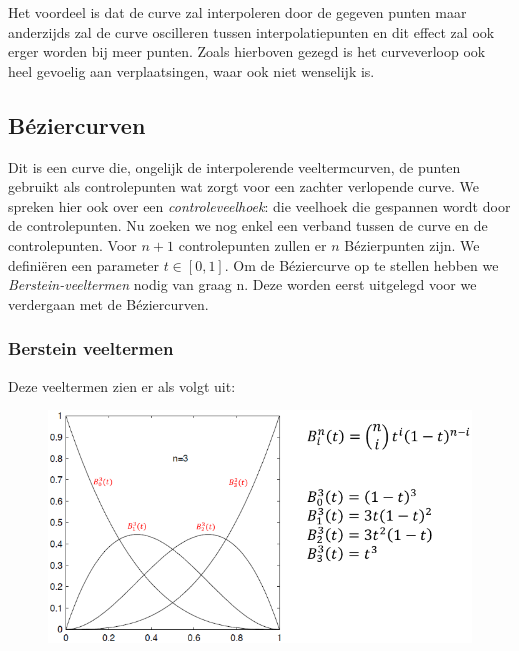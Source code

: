 \documentclass[12pt,a4paper]{article}
\begin{document}
	Het voordeel is dat de curve zal interpoleren door de gegeven punten maar anderzijds zal de curve oscilleren tussen interpolatiepunten en dit effect zal ook erger worden bij meer punten. Zoals hierboven gezegd is het curveverloop ook heel gevoelig aan verplaatsingen, waar ook niet wenselijk is. 
	
	
	\subsection{Béziercurven}
	Dit is een curve die, ongelijk de interpolerende veeltermcurven, de punten gebruikt als controlepunten wat zorgt voor een zachter verlopende curve. We spreken hier ook over een \textit{controleveelhoek}: die veelhoek die gespannen wordt door de controlepunten. Nu zoeken we nog enkel een verband tussen de curve en de controlepunten. Voor $n+1$ controlepunten zullen er $n$ Bézierpunten zijn. We definiëren een parameter $t\in [0, 1] $. Om de Béziercurve op te stellen hebben we \textit{Berstein-veeltermen} nodig van graag n. Deze worden eerst uitgelegd voor we verdergaan met de Béziercurven. 
	
	\subsubsection*{Berstein veeltermen}
	Deze veeltermen zien er als volgt uit: 
	\begin{figure}[H]
		\centering
		\includegraphics[width=0.8\linewidth]{afbeeldingen/Beziercurven/Bernstein}
		\label{fig:bernstein}
	\end{figure}
\end{document}
